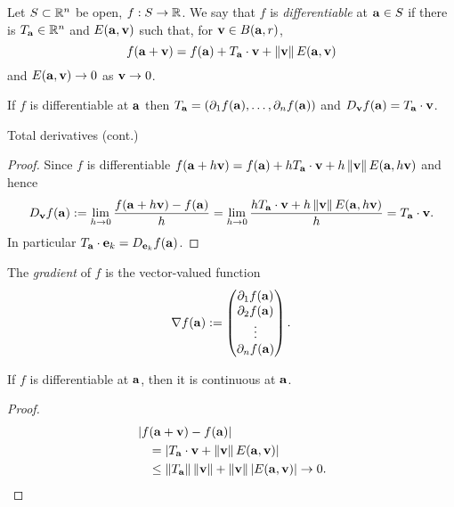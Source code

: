 \begin{definition}[Differentiable]
    Let \(S\subset \bR^n\) be open, \(f:S \to \bR\).
    We say that \(f\) is \emph{differentiable} at \(\aa \in S\) if there is \(T_\aa \in \bR^n\) and \(E(\aa,\vv)\) such that, for \(\vv\in B(\aa,r)\),
    \[
        f(\aa+\vv) = f(\aa) + T_\aa \cdot \vv + \norm{\vv}E(\aa,\vv)
    \]
    and \(E(\aa,\vv) \to 0\) as \(\vv \to 0\).
\end{definition}

\begin{theorem}
    If \(f\) is differentiable at \(\aa\)
    then \(T_\aa = \left( \partial_1 f(\aa), \ldots, \partial_nf(\aa) \right)\)
    and \(D_{\vv}f(\aa) = T_{\aa}\cdot \vv\).
\end{theorem}




{Total derivatives (cont.)}
\begin{proof}
    Since \(f\) is differentiable
    \(  f(\aa+ h \vv) = f(\aa) + h T_\aa \cdot \vv + h\norm{\vv}E(\aa,h\vv)\)
    and hence
    \[
        D_{\vv}f(\aa) :=
        \lim_{h\to 0} \frac{f(\aa+h \vv) - f(\aa)}{h}
        =
        \lim_{h\to 0} \frac{ h T_\aa \cdot \vv + h\norm{\vv}E(\aa,h\vv) }{h}
        = T_\aa \cdot \vv.
    \]
    In particular \(T_\aa\cdot \ee_k = D_{\ee_k}f(\aa)\).
\end{proof}





%
\begin{definition}[Gradient]
    The \emph{gradient} of \(f\) is the vector-valued function
    \[
        \nabla f(\aa) :=
        \begin{pmatrix}
            \partial_1 f(\aa) \\
            \partial_2 f(\aa) \\
            \vdots            \\
            \partial_nf(\aa)
        \end{pmatrix}.
    \]
\end{definition}
%




\begin{theorem}
    If \(f\) is differentiable at \(\aa\), then it is continuous at \(\aa\).
\end{theorem}
\begin{proof}
    \vspace{-2em}
    \begin{align*}
         & \abs{f(\aa+\vv)-f(\aa)}                                                            \\
         & \quad = \abs{ T_\aa \cdot \vv + \norm{\vv}E(\aa,\vv)  }                            \\
         & \quad \leq  \norm{T_\aa } \norm{\vv} + \norm{\vv} \abs{E(\aa,\vv)} \to 0. \qedhere
    \end{align*}
\end{proof}








